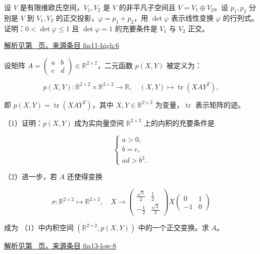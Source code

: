 \documentclass[UTF8,12pt,a4paper,fontset=fandol]{ctexart}
\begin{document}
\begin{example}\label{ex:fin11-high:6}

设 $V$ 是有限维欧氏空间，$V_{1}, V_{2}$ 是 $V$ 的非平凡子空间且 $V = V_{1} \oplus V_{2}$。设 $p_{1}, p_{2}$ 分别是 $V$ 到 $V_{1}, V_{2}$ 的正交投影，$\varphi = p_{1} + p_{2}$，用 $\det \varphi$ 表示线性变换 $\varphi$ 的行列式。证明：$0 < \det\varphi \leq 1$ 且 $\det\varphi = 1$ 的充要条件是 $V_{1}$ 与 $V_{2}$ 正交。

\par\hyperref[ans:fin11-high:6]{解析见第~\pageref{ans:fin11-high:6} 页。}\quad\href{https://github.com/lzxcr/cmc-mathematics/blob/64916fa1fdbc3e444a652eca204d5669058ee321/src/problems/finals/11/06.md}{来源条目 fin11-high:6}

\end{example}

\begin{example}\label{ex:fin13-low:8}

设矩阵 $A = \begin{pmatrix} a & b \\ c & d \end{pmatrix} \in \mathbb{R}^{2 \times 2}$，二元函数 $p(X, Y)$ 被定义为：

\[
p(X, Y) : \mathbb{R}^{2 \times 2} \times \mathbb{R}^{2 \times 2} \rightarrow \mathbb{R}, \quad (X, Y) \mapsto \operatorname{tr}\left(X A Y^{T}\right),
\]

即 $p(X, Y) = \operatorname{tr}\left(X A Y^{T}\right)$，其中 $X, Y \in \mathbb{R}^{2 \times 2}$ 为变量，$\operatorname{tr}$ 表示矩阵的迹。

（1）证明：$p(X, Y)$ 成为实向量空间 $\mathbb{R}^{2 \times 2}$ 上的内积的充要条件是

\[
\begin{cases} a > 0, \\ b = c, \\ ad > b^{2}. \end{cases}
\]

（2）进一步，若 $A$ 还使得变换

\[
\sigma : \mathbb{R}^{2 \times 2} \mapsto \mathbb{R}^{2 \times 2}, \quad X \rightarrow \begin{pmatrix} \frac{\sqrt{3}}{2} & \frac{1}{2} \\ -\frac{1}{2} & \frac{\sqrt{3}}{2} \end{pmatrix} X \begin{pmatrix} 0 & 1 \\ -1 & 0 \end{pmatrix}
\]

成为 （1）中内积空间 $\left(\mathbb{R}^{2 \times 2}, p(X, Y)\right)$ 中的一个正交变换。求 $A$。

\par\hyperref[ans:fin13-low:8]{解析见第~\pageref{ans:fin13-low:8} 页。}\quad\href{https://github.com/lzxcr/cmc-mathematics/blob/64916fa1fdbc3e444a652eca204d5669058ee321/src/problems/finals/13/08.md}{来源条目 fin13-low:8}

\end{example}
\end{document}
